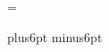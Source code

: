 \parindent=0pt
\parskip=\smallskipamount

\newdimen\prob@sidesize \prob@sidesize=20pt
\newdimen\prob@rulegap  \prob@rulegap=5pt
\newskip\prob@topskip   \prob@topskip=16pt plus6pt minus6pt

\newcount\@count   \newcount\@@count
\newskip\@skip     \newskip\@@skip
\newmuskip\@muskip \newmuskip\@@muskip
\newdimen\@dimen   \newdimen\@@dimen
\newbox\@box       \newbox\@@box



% 
% 

\let\newfam=\@undefined
\def\newfam{\errmessage{Don't use \noexpand\newfam with defs.tex!}}

\newdimen\Fsize \newdimen\Ftsize \newdimen\Fssize \newdimen\Fsssize
\newdimen\Fbight \newdimen\FBight \newdimen\Fbigght \newdimen\FBigght
\newcount\@Fskewchar \newcount\@Fhyphenchar
\newcount\@Fscalenum \newcount\@Fscaleden

